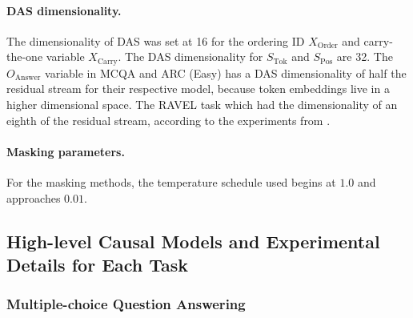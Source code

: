 \documentclass{article}
\theoremstyle{plain}
\theoremstyle{definition}
\theoremstyle{remark}
\newcommand{\order}{X_{\text{Order}}}
\newcommand{\token}{S_{\text{Tok}}}
\newcommand{\position}{S_{\text{Pos}}}
\newcommand{\answer}{O_{\text{Answer}}}
\newcommand{\carry}{X_{\text{Carry}}}
\begin{document}
\paragraph{DAS dimensionality.} The dimensionality of DAS was set at 16 for the ordering ID $\order$ and carry-the-one variable $\carry$. The DAS dimensionality for $\token$ and $\position$ are 32. The $\answer$ variable in MCQA and ARC (Easy) has a DAS dimensionality of half the residual stream for their respective model, because token embeddings live in a higher dimensional space. The RAVEL task which had the dimensionality of an eighth of the residual stream, according to the experiments from \citep{huang-etal-2024-ravel}.

\paragraph{Masking parameters.} For the masking methods, the temperature schedule used begins at $1.0$ and approaches $0.01$. 

\subsection{High-level Causal Models and Experimental Details for Each Task}\label{app:causalvariabletracktaskdetails}
\usetikzlibrary{arrows.meta, positioning, shapes.geometric}
\subsubsection{Multiple-choice Question Answering}\label{app:causalvariableMCQAdetails}
\end{document}
